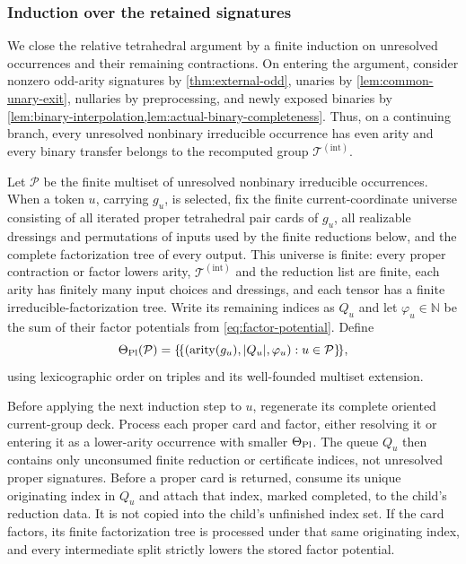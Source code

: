 \documentclass[11pt,letterpaper,onecolumn]{article}
\theoremstyle{plain}
\theoremstyle{definition}
\theoremstyle{remark}
\newcommand{\TetInt}{{\mathcal T^{(\mathrm{int})}}}
\newcommand{\arity}{\operatorname{arity}}
\begin{document}
\subsubsection{Induction over the retained signatures}
We close the relative tetrahedral argument by a finite induction on
unresolved occurrences and their remaining contractions.  On entering the argument,
consider nonzero odd-arity signatures by \cref{thm:external-odd}, unaries by
\cref{lem:common-unary-exit}, nullaries by preprocessing, and newly exposed
binaries by
\cref{lem:binary-interpolation,lem:actual-binary-completeness}.  Thus, on a
continuing branch, every unresolved nonbinary irreducible occurrence has
even arity and every binary transfer belongs to the recomputed group
\(\TetInt\).

Let \(\mathcal P\) be the finite multiset of unresolved nonbinary
irreducible occurrences.  When a token \(u\), carrying \(g_u\), is
selected, fix the finite current-coordinate universe consisting of all
iterated proper tetrahedral pair cards of \(g_u\), all realizable
dressings and permutations of inputs used by the finite reductions below, and the
complete factorization tree of every output.  This universe is finite: every
proper contraction or factor lowers arity, \(\TetInt\) and the reduction
list are finite, each arity has finitely many input choices and dressings,
and each tensor has a finite irreducible-factorization tree.  Write its remaining indices as \(Q_u\)
and let \(\varphi_u\in\mathbb N\) be the sum of their factor potentials from
\cref{eq:factor-potential}.  Define
\hypertarget{eq:platonic-occurrence-rank}{}
\begin{equation*}
 \Theta_{\rm Pl}(\mathcal P)
 =\{\!\{(\arity(g_u),|Q_u|,\varphi_u):u\in\mathcal P\}\!\},
\end{equation*}
using lexicographic order on triples and its well-founded multiset
extension.

Before applying the next induction step to \(u\), regenerate its complete
oriented current-group deck.  Process each proper card and factor, either
resolving it or entering it as a lower-arity occurrence with smaller
\(\Theta_{\rm Pl}\).  The queue \(Q_u\) then contains only
unconsumed finite reduction or certificate indices, not unresolved proper
signatures.  Before a proper card is returned, consume its unique
originating index in \(Q_u\) and attach that index, marked completed, to the
child's reduction data. It is not copied into the child's unfinished index set.
If the card factors, its finite factorization tree is processed under that same
originating index, and every intermediate split strictly lowers the stored
factor potential.
\end{document}
